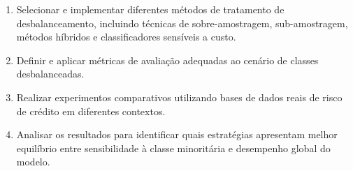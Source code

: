 \begin{enumerate}
  \item Selecionar e implementar diferentes métodos de tratamento de desbalanceamento, incluindo técnicas de sobre-amostragem, sub-amostragem, métodos híbridos e classificadores sensíveis a custo.
  \item Definir e aplicar métricas de avaliação adequadas ao cenário de classes desbalanceadas.
  \item Realizar experimentos comparativos utilizando bases de dados reais de risco de crédito em diferentes contextos.
  \item Analisar os resultados para identificar quais estratégias apresentam melhor equilíbrio entre sensibilidade à classe minoritária e desempenho global do modelo.
\end{enumerate}
